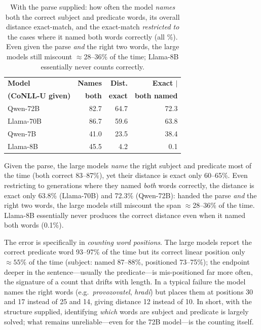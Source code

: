 \documentclass[11pt]{article}
\begin{document}
\begin{table}[t]
\centering\small
\setlength{\tabcolsep}{5pt}
\begin{tabular}{lrrr}
\toprule
\textbf{Model} & \textbf{Names} & \textbf{Dist.} & \textbf{Exact $\mid$} \\
\textbf{(CoNLL-U given)} & \textbf{both} & \textbf{exact} & \textbf{both named} \\
\midrule
Qwen-72B  & 82.7 & 64.7 & 72.3 \\
Llama-70B & 86.7 & 59.6 & 63.8 \\
Qwen-7B   & 41.0 & 23.5 & 38.4 \\
Llama-8B  & 45.5 &  4.2 &  0.1 \\
\bottomrule
\end{tabular}
\caption{With the parse supplied: how often the model \emph{names} both the correct subject and
predicate words, its overall distance exact-match, and the exact-match \emph{restricted to} the
cases where it named both words correctly (all \%). Even given the parse \emph{and} the right two
words, the large models still miscount $\approx$28--36\% of the time; Llama-8B essentially never
counts correctly.}
\label{tab:pure}
\end{table}

Given the parse, the large models \emph{name} the right subject and predicate most of the time (both
correct 83--87\%), yet their distance is exact only 60--65\%. Even restricting to generations where
they named \emph{both} words correctly, the distance is exact only 63.8\% (Llama-70B) and 72.3\%
(Qwen-72B): handed the parse \emph{and} the right two words, the large models still miscount the span
$\approx$28--36\% of the time. Llama-8B essentially never produces the correct distance even when it
named both words (0.1\%).

The error is specifically in \emph{counting word positions}. The large models report the correct
predicate word 93--97\% of the time but its correct linear position only ${\approx}55\%$ of the time
(subject: named 87--88\%, positioned 73--75\%); the endpoint deeper in the sentence---usually the
predicate---is mis-positioned far more often, the signature of a count that drifts with length. In a
typical failure the model names the right words (e.g.\ \emph{provozovatel}, \emph{hrad\'{i}}) but
places them at positions 30 and 17 instead of 25 and 14, giving distance 12 instead of 10. In short,
with the structure supplied, identifying \emph{which} words are subject and predicate is largely
solved; what remains unreliable---even for the 72B model---is the counting itself.
\end{document}
